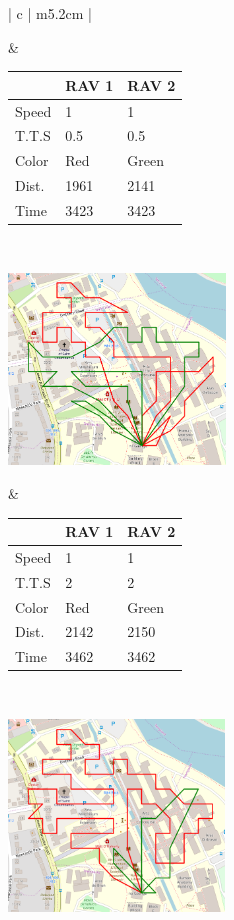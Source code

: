 \begin{table}[H]
\begin{tabular}{ | c | m{5.2cm} | }
\begin{minipage}[c][53mm][c]{.6\textwidth}
    \end{minipage}
    &
    \small
    \begin{tabular}{m{10mm}|m{11mm} m{11mm} }
        & RAV 1 & RAV 2\\
        \hline
        Speed& 1 & 1 \\
        T.T.S & 0.5 & 0.5 \\
        Color & Red & Green \\
        \hline
        Dist.& 1961 & 2141 \\
        Time& 3423 & 3423 \\
    \end{tabular}
    \normalsize
    \\
    \hline
    
    \begin{minipage}[c][53mm][c]{.6\textwidth}
      \includegraphics[width=\linewidth, height=51mm]{Chapters/MultiAgentCoverage/MultipleTravellingSalesman/Figs/ORToolsSolns/Example3.PNG}

    \end{minipage}
    &
    \small
    \begin{tabular}{m{10mm}|m{11mm} m{11mm}}
        & RAV 1 & RAV 2\\
        \hline
        Speed& 1 & 1 \\
        T.T.S & 2 & 2 \\
        Color & Red & Green \\
        \hline
        Dist.& 2142 & 2150 \\
        Time& 3462 & 3462 \\
    \end{tabular}
    \normalsize
    \\
    \hline
    
    \begin{minipage}[c][53mm][c]{.6\textwidth}
      \includegraphics[width=\linewidth, height=51mm]{Chapters/MultiAgentCoverage/MultipleTravellingSalesman/Figs/ORToolsSolns/Example4.PNG}


\end{minipage}
\end{tabular}
\end{table}

